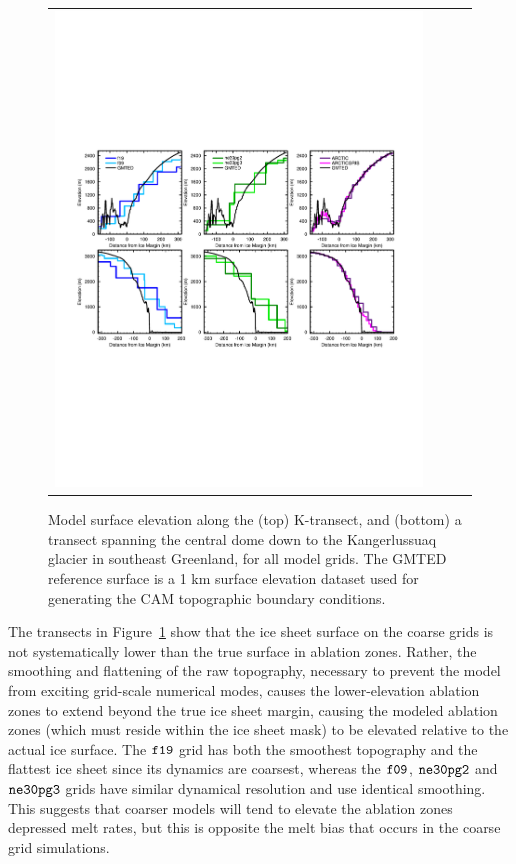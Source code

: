 \documentclass[draft]{agujournal2019}
\begin{document}
\begin{figure}[t]
\begin{center}
\begin{tabular}{cccc}
         \includegraphics[width=130mm]{temp_zsects.pdf}
\end{tabular}
\end{center}
\caption{Model surface elevation along the (top) K-transect, and (bottom) a transect spanning the central dome down to the Kangerlussuaq glacier in southeast Greenland, for all model grids. The GMTED reference surface is a 1 km surface elevation dataset \cite{GMTED2010} used for generating the CAM topographic boundary conditions. }
\label{fig:ztrans}
\end{figure}

The transects in Figure~\ref{fig:ztrans} show that the ice sheet surface on the coarse grids is not systematically lower than the true surface in ablation zones. Rather, the smoothing and flattening of the raw topography, necessary to prevent the model from exciting grid-scale numerical modes, causes the lower-elevation ablation zones to extend beyond the true ice sheet margin, causing the modeled ablation zones (which must reside within the ice sheet mask) to be elevated relative to the actual ice surface. The $\tt f19$ grid has both the smoothest topography and the flattest ice sheet since its dynamics are coarsest, whereas the $\tt f09$, $\tt ne30pg2$ and $\tt ne30pg3$ grids have similar dynamical resolution and use identical smoothing. This suggests that coarser models will tend to elevate the ablation zones {\color{blue}{relative to where they should be, which may be expected to cause anomalous (adiabatic) cooling and}} depressed melt rates, but this is opposite the melt bias that occurs in the coarse grid simulations.
\end{document}
